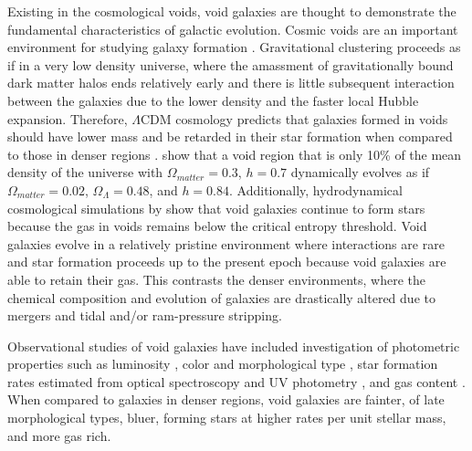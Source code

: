 Existing in the cosmological voids, void galaxies are thought to demonstrate the 
fundamental characteristics of galactic evolution.  Cosmic voids are an 
important environment for studying galaxy formation \citep[see][for a review]
{vandeWeygaert11}.  Gravitational clustering proceeds as if in a very low 
density universe, where the amassment of gravitationally bound dark matter halos 
ends relatively early and there is little subsequent interaction between the 
galaxies due to the lower density and the faster local Hubble expansion.  
Therefore, $\Lambda$CDM cosmology predicts that galaxies formed in voids should 
have lower mass and be retarded in their star formation when compared to those 
in denser regions \cite[e.g.,][]{Gottlober03,Goldberg05,Cen11}.  
\cite{Goldberg04} show that a void region that is only 10\% of the mean density 
of the universe with $\Omega_{matter} = 0.3$, $h = 0.7$ dynamically evolves as 
if $\Omega_{matter} = 0.02$, $\Omega_\Lambda = 0.48$, and $h = 0.84$.  
Additionally, hydrodynamical cosmological simulations by \cite{Cen11} show that 
void galaxies continue to form stars because the gas in voids remains below the 
critical entropy threshold.  Void galaxies evolve in a relatively pristine 
environment where interactions are rare and star formation proceeds up to the 
present epoch because void galaxies are able to retain their gas.  This 
contrasts the denser environments, where the chemical composition and evolution 
of galaxies are drastically altered due to mergers and tidal and/or ram-pressure 
stripping.

Observational studies of void galaxies have included investigation of 
photometric properties such as luminosity \citep{Hoyle05,Croton05,Moorman15}, 
color and morphological type \citep{Grogin00,Rojas04,Patiri06,Park07,
vonBendaBeckmann08,Hoyle12}, star formation rates estimated from optical 
spectroscopy and UV photometry \citep{Rojas05,Moorman15,Beygu16}, and gas 
content \citep{Kreckel12,Moorman16,Jones16}.  When compared to galaxies in 
denser regions, void galaxies are fainter, of late morphological types, bluer, 
forming stars at higher rates per unit stellar mass, and more gas rich.

